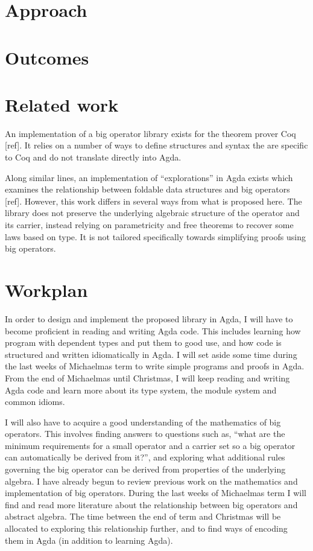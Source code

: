 \documentclass[a4paper]{scrartcl}
\begin{document}
\section{Approach%
  \label{approach}%
}



\section{Outcomes%
  \label{outcomes}%
}

\section{Related work%
  \label{related-work}%
}

An implementation of a big operator library exists for the theorem prover Coq {[}ref{]}. It relies on a number of ways to define structures and syntax the are specific to Coq and do not translate directly into Agda.

Along similar lines, an implementation of \enquote{explorations} in Agda exists which examines the relationship between foldable data structures and big operators {[}ref{]}. However, this work differs in several ways from what is proposed here. The library does not preserve the underlying algebraic structure of the operator and its carrier, instead relying on parametricity and free theorems to recover some laws based on type. It is not tailored specifically towards simplifying proofs using big operators.

\section{Workplan%
  \label{workplan}%
}

In order to design and implement the proposed library in Agda, I will have to become proficient in reading and writing Agda code. This includes learning how program with dependent types and put them to good use, and how code is structured and written idiomatically in Agda. I will set aside some time during the last weeks of Michaelmas term to write simple programs and proofs in Agda. From the end of Michaelmas until Christmas, I will keep reading and writing Agda code and learn more about its type system, the module system and common idioms.

I will also have to acquire a good understanding of the mathematics of big operators. This involves finding answers to questions such as, \enquote{what are the minimum requirements for a small operator and a carrier set so a big operator can automatically be derived from it?}, and exploring what additional rules governing the big operator can be derived from properties of the underlying algebra. I have already begun to review previous work on the mathematics and implementation of big operators. During the last weeks of Michaelmas term I will find and read more literature about the relationship between big operators and abstract algebra. The time between the end of term and Christmas will be allocated to exploring this relationship further, and to find ways of encoding them in Agda (in addition to learning Agda).
\end{document}
